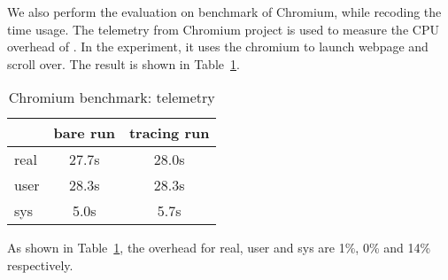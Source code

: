 We also perform the evaluation on benchmark of Chromium, while recoding the time usage.
The telemetry from Chromium project is used to measure the CPU overhead of \xxx.
In the experiment, it uses the chromium to launch webpage and scroll over.
The result is shown in Table~\ref{tab:chromium benchmark}. 
\begin{table}[h]
\begin{tabular}{l|c|c}
\hline
 & bare run & tracing run \\
\hline
real & 27.7s & 28.0s \\
\hline
user & 28.3s & 28.3s \\
\hline
sys &  5.0s & 5.7s\\
\hline
\end{tabular}
\caption{Chromium benchmark: telemetry}
\label{tab:chromium benchmark}
\end{table}

As shown in Table~\ref{tab:chromium benchmark}, the overhead for real, user and sys are 1\%, 0\% and
14\% respectively.
